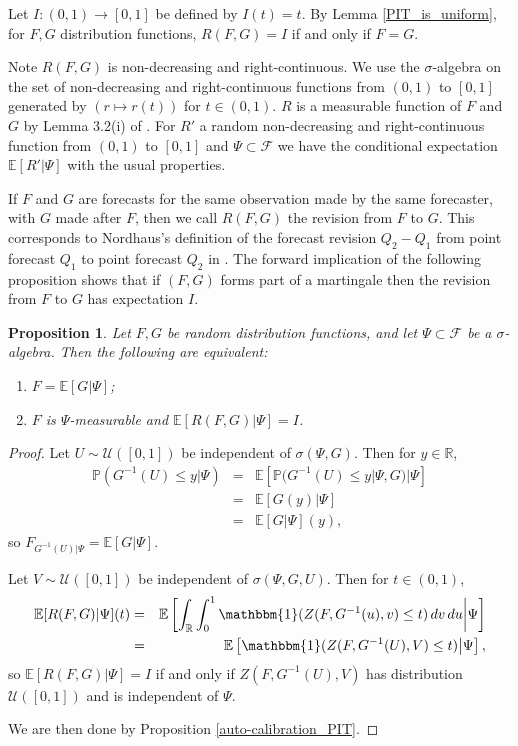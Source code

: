 \documentclass[aap]{imsart}
\theoremstyle{plain}
\newtheorem{proposition}[theorem]{Proposition}
\theoremstyle{definition}
\begin{document}
Let $I : (0,1) \to [0,1]$ be defined by $I(t) = t$. By Lemma \ref{PIT_is_uniform}, for $F, G$ distribution functions, $R(F, G) = I$ if and only if $F = G$.

Note $R(F, G)$ is non-decreasing and right-continuous. We use the $\sigma$-algebra on the set of non-decreasing and right-continuous functions from $(0,1)$ to $[0,1]$ generated by $(r \mapsto r(t))$ for $t \in (0,1)$. $R$ is a measurable function of $F$ and $G$ by Lemma 3.2(i) of \cite{Kll21}. For $R'$ a random non-decreasing and right-continuous function from $(0,1)$ to $[0,1]$ and $\Psi \subset \mathcal{F}$ we have the conditional expectation $\mathbb{E}[R'|\Psi]$ with the usual properties.

If $F$ and $G$ are forecasts for the same observation made by the same forecaster, with $G$ made after $F$, then we call $R(F, G)$ the revision from $F$ to $G$. This corresponds to Nordhaus's definition of the forecast revision $Q_2 - Q_1$ from point forecast $Q_1$ to point forecast $Q_2$ in \cite{nrd87}. The forward implication of the following proposition shows that if $(F, G)$ forms part of a martingale then the revision from $F$ to $G$ has expectation $I$.
\begin{proposition}\label{R}
  Let $F, G$ be random distribution functions, and let $\Psi \subset \mathcal{F}$ be a $\sigma$-algebra. Then the following are equivalent:

\begin{enumerate}[label=(\roman*)]
  \item $F = \mathbb{E}[G|\Psi]$;
  \item $F$ is $\Psi$-measurable and $\mathbb{E}[R(F,G)|\Psi] = I$.
\end{enumerate}
\end{proposition}

\begin{proof}
Let $U \sim \mathcal{U}([0,1])$ be independent of $\sigma(\Psi, G)$. Then for $y \in \mathbb{R}$,
\begin{eqnarray*}
\mathbb{P}(G^{-1}(U) \leq y|\Psi) & = & \mathbb{E}[\mathbb{P}(G^{-1}(U) \leq y|\Psi, G)|\Psi] \\
                                  & = & \mathbb{E}[G(y)|\Psi] \\
                                  & = & \mathbb{E}[G|\Psi](y),
\end{eqnarray*}
so $F_{G^{-1}(U)|\Psi} = \mathbb{E}[G|\Psi]$.

  Let $V \sim \mathcal{U}([0,1])$ be independent of $\sigma(\Psi, G, U)$. Then for $t \in (0,1)$,
\begin{eqnarray*}
  \mathbb{E}[R(F, G)|\Psi](t) & = & \mathbb{E}\left[ \int_\mathbb{R} \int_0^1 \mathbbm{1}(Z(F, G^{-1}(u), v) \leq t) \,dv \,du \middle| \Psi \right] \\
                              & = & \mathbb{E}\left[ \mathbbm{1}(Z(F, G^{-1}(U), V) \leq t) \middle| \Psi \right],
\end{eqnarray*}
  so $\mathbb{E}[R(F, G)|\Psi] = I$ if and only if $Z(F, G^{-1}(U), V)$ has distribution $\mathcal{U}([0,1])$ and is independent of $\Psi$.

  We are then done by Proposition \ref{auto-calibration_PIT}.
\end{proof}
\end{document}
